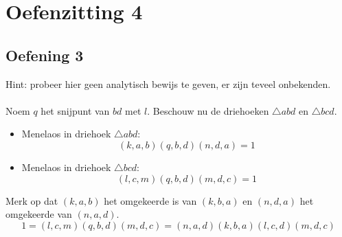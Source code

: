 \documentclass[main.tex]{subfiles}
\begin{document}
\section{Oefenzitting 4}
\label{sec:oefenzitting-4}


\subsection*{Oefening 3}
\begin{figure}[H]
  \centering
\end{figure}

Hint: probeer hier geen analytisch bewijs te geven, er zijn teveel onbekenden.\\\\
Noem $q$ het snijpunt van $bd$ met $l$.
Beschouw nu de driehoeken $\triangle abd$ en $\triangle bcd$.
\begin{itemize}
\item Menelaos in driehoek $\triangle abd$:
  \[ (k,a,b)(q,b,d)(n,d,a) = 1 \]
\item Menelaos in driehoek $\triangle bcd$:
  \[ (l,c,m)(q,b,d)(m,d,c) = 1 \]
\end{itemize}
Merk op dat $(k,a,b)$ het omgekeerde is van $(k,b,a)$ en $(n,d,a)$ het omgekeerde van $(n,a,d)$.
\[ 1 = (l,c,m)(q,b,d)(m,d,c) = (n,a,d)(k,b,a)(l,c,d)(m,d,c) \]
\end{document}
